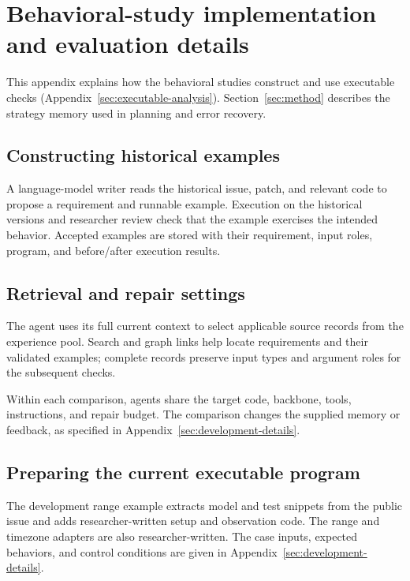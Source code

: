 \section{Behavioral-study implementation and evaluation details}
\label{sec:method-contract}
This appendix explains how the behavioral studies construct and use
executable checks (Appendix~\ref{sec:executable-analysis}). Section~\ref{sec:method}
describes the strategy memory used in planning and error recovery.
\subsection{Constructing historical examples}
A language-model writer reads the historical issue, patch, and relevant code
to propose a requirement and runnable example. Execution on the historical
versions and researcher review check that the example exercises the intended
behavior. Accepted examples are stored with their requirement, input roles,
program, and before/after execution results.

\subsection{Retrieval and repair settings}
The agent uses its full current context to select applicable source records
from the experience pool. Search and graph links help locate requirements
and their validated examples; complete records preserve input types and
argument roles for the subsequent checks.

Within each comparison, agents share the target code, backbone, tools,
instructions, and repair budget. The comparison changes the supplied
memory or feedback, as specified in Appendix~\ref{sec:development-details}.

\subsection{Preparing the current executable program}
\label{sec:public-program}
The development range example extracts model and test snippets from the
public issue and adds researcher-written setup and observation code. The
range and timezone adapters are also researcher-written. The case inputs,
expected behaviors, and control conditions are given in
Appendix~\ref{sec:development-details}.

